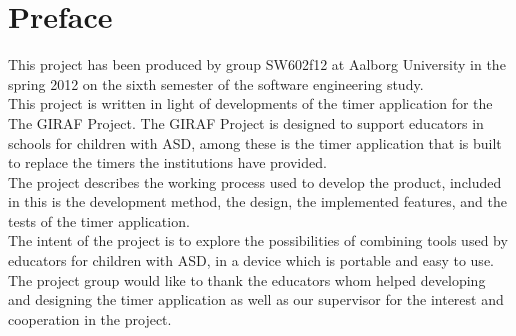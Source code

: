 \chapter*{Preface}
This project has been produced by group SW602f12 at Aalborg University in the spring 2012 on the sixth semester of the software engineering study.\\

This project is written in light of developments of the timer application for the The GIRAF Project. The GIRAF Project is designed to support educators in schools for children with ASD, among these is the timer application that is built to replace the timers the institutions have provided.\\

The project describes the working process used to develop the product, included in this is the development method, the design, the implemented features, and the tests of the timer application.\\

The intent of the project is to explore the possibilities of combining tools used by educators for children with ASD, in a device which is portable and easy to use.\\

The project group would like to thank the educators whom helped developing and designing the timer application as well as our supervisor for the interest and cooperation in the project.